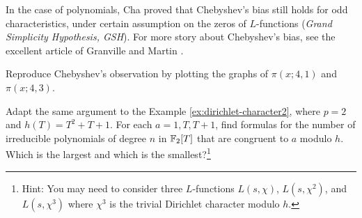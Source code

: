 In the case of polynomials, Cha \cite{cha2008chebyshev} proved that Chebyshev's bias still holds for odd characteristics, under certain assumption on the zeros of $L$-functions (\emph{Grand Simplicity Hypothesis, GSH}).
For more story about Chebyshev's bias, see the excellent article of Granville and Martin \cite{granville2006prime}.

\begin{exercise}\sage
    Reproduce Chebyshev's observation by plotting the graphs of $\pi(x;4,1)$ and $\pi(x;4,3)$.
\end{exercise}

\begin{exercise}
    Adapt the same argument to the Example \ref{ex:dirichlet-character2}, where $p = 2$ and $h(T) = T^2 + T + 1$.
    For each $a = 1, T, T + 1$, find formulas for the number of irreducible polynomials of degree $n$ in $\mathbb{F}_2[T]$ that are congruent to $a$ modulo $h$.
    Which is the largest and which is the smallest?\footnote{Hint: You may need to consider three $L$-functions $L(s, \chi)$, $L(s, \chi^2)$, and $L(s, \chi^3)$ where $\chi^3$ is the trivial Dirichlet character modulo $h$.}
\end{exercise}

\newpage